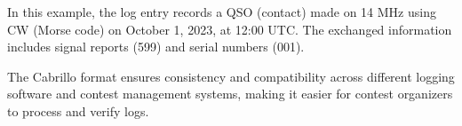 In this example, the log entry records a QSO (contact) made on 14 MHz using CW (Morse code) on October 1, 2023, at 12:00 UTC. The exchanged information includes signal reports (599) and serial numbers (001).

The Cabrillo format ensures consistency and compatibility across different logging software and contest management systems, making it easier for contest organizers to process and verify logs.

